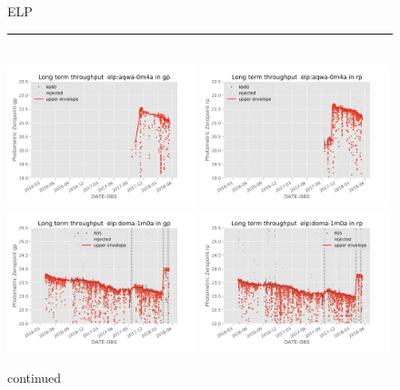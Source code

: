 \documentclass[draft]{spieman}
\begin{document}
\begin{figure}
ELP  \\ 
\rule{\textwidth}{0.4pt} \\
\includegraphics[width=0.49\textwidth]{images/photzptrend-elp-aqwa-0m4a-gp.png} \hspace*{\fill}
\includegraphics[width=0.49\textwidth]{images/photzptrend-elp-aqwa-0m4a-rp.png} \\
\includegraphics[width=0.49\textwidth]{images/photzptrend-elp-doma-1m0a-gp.png} \hspace*{\fill}
\includegraphics[width=0.49\textwidth]{images/photzptrend-elp-doma-1m0a-rp.png} \\[1ex]
\caption {continued}
\end{figure}
\end{document}
